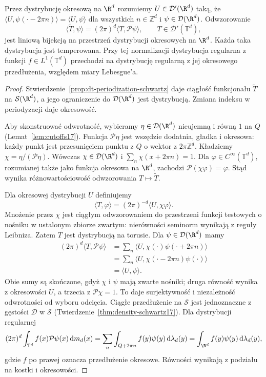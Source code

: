 \begin{twierdzenie}
\label{thm:dt-periodic-lift}
Przez dystrybucję okresową na $\R^d$ rozumiemy
$U\in\mathcal D'(\R^d)$ taką, że
$\langle U,\psi(\cdot-2\pi n)\rangle
=\langle U,\psi\rangle$ dla wszystkich
$n\in\mathbb Z^d$ i $\psi\in\mathcal D(\R^d)$.
Odwzorowanie
\[
 \langle\widetilde T,\psi\rangle
 =(2\pi)^d\langle T,\mathcal P\psi\rangle,
 \qquad T\in\mathcal D'(\mathbb T^d),
\]
jest liniową bijekcją na przestrzeń dystrybucji
okresowych na $\R^d$. Każda taka dystrybucja
jest temperowana.
Przy tej normalizacji dystrybucja regularna
z funkcji $f\in L^1(\mathbb T^d)$ przechodzi
na dystrybucję regularną z jej okresowego
przedłużenia, względem miary Lebesgue'a.
\end{twierdzenie}
\begin{proof}
Stwierdzenie~\ref{prop:dt-periodization-schwartz}
daje ciągłość funkcjonału $\widetilde T$ na
$\mathcal S(\R^d)$, a jego ograniczenie do
$\mathcal D(\R^d)$ jest dystrybucją.
Zmiana indeksu w periodyzacji daje okresowość.

Aby skonstruować odwrotność, wybieramy
$\eta\in\mathcal D(\R^d)$ nieujemną i równą $1$
na $Q$ (Lemat~\ref{lem:cutoffs17}).
Funkcja $\mathcal P\eta$ jest wszędzie dodatnia,
gładka i okresowa: każdy punkt jest przesunięciem
punktu z $Q$ o wektor z $2\pi\mathbb Z^d$.
Kładziemy $\chi=\eta/(\mathcal P\eta)$.
Wówczas $\chi\in\mathcal D(\R^d)$ i
$\sum_n\chi(x+2\pi n)=1$.
Dla $\varphi\in C^\infty(\mathbb T^d)$, rozumianej
także jako funkcja okresowa na $\R^d$, zachodzi
$\mathcal P(\chi\varphi)=\varphi$.
Stąd wynika różnowartościowość odwzorowania
$T\mapsto\widetilde T$.

Dla okresowej dystrybucji $U$ definiujemy
\[
 \langle T,\varphi\rangle
 =(2\pi)^{-d}\langle U,\chi\varphi\rangle.
\]
Mnożenie przez $\chi$ jest ciągłym odwzorowaniem
do przestrzeni funkcji testowych o nośniku
w ustalonym zbiorze zwartym: nierówności
seminorm wynikają z reguły Leibniza.
Zatem $T$ jest dystrybucją na torusie.
Dla $\psi\in\mathcal D(\R^d)$ mamy
\[
 \begin{aligned}
 (2\pi)^d\langle T,\mathcal P\psi\rangle
 &=\sum_n\langle U,\chi(\cdot)\psi(\cdot+2\pi n)\rangle\\
 &=\sum_n\langle U,\chi(\cdot-2\pi n)\psi(\cdot)\rangle\\
 &=\langle U,\psi\rangle.
 \end{aligned}
\]
Obie sumy są skończone, gdyż $\chi$ i $\psi$
mają zwarte nośniki; druga równość wynika
z okresowości $U$, a trzecia z $\mathcal P\chi=1$.
To daje surjektywność i niezależność odwrotności
od wyboru odcięcia. Ciągłe przedłużenie na $\mathcal S$
jest jednoznaczne z gęstości $\mathcal D$ w $\mathcal S$
(Twierdzenie~\ref{thm:density-schwartz17}).
Dla dystrybucji regularnej
\[
 (2\pi)^d\int_{\mathbb T^d} f(x)\mathcal P\psi(x)
 \,\mathrm dm_d(x)
 =\sum_n\int_{Q+2\pi n} f(y)\psi(y)\,\mathrm d\lambda_d(y)
 =\int_{\R^d} f(y)\psi(y)\,\mathrm d\lambda_d(y),
\]
gdzie $f$ po prawej oznacza przedłużenie okresowe.
Równości wynikają z podziału na kostki i okresowości.
\end{proof}

